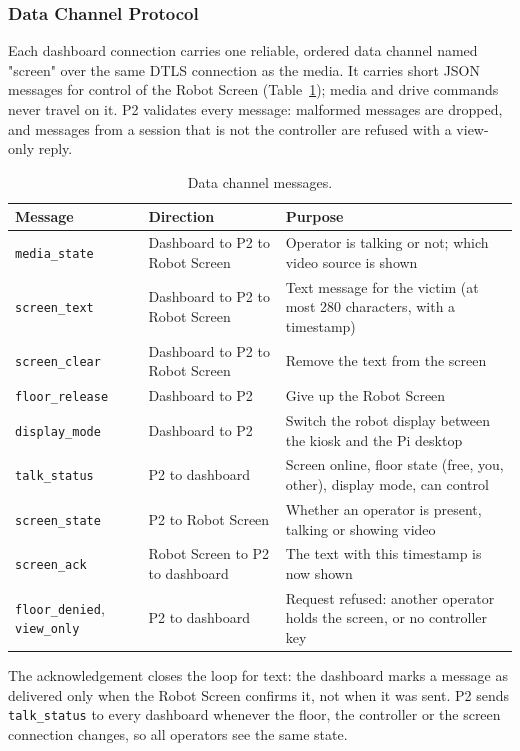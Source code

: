\subsubsection{Data Channel Protocol}
\label{sec:data_channel}

Each dashboard connection carries one reliable, ordered data channel named "screen" over the same DTLS connection as the media. It carries short JSON messages for control of the Robot Screen (Table~\ref{tab:13}); media and drive commands never travel on it. P2 validates every message: malformed messages are dropped, and messages from a session that is not the controller are refused with a view-only reply.

\begin{table}[!t]
\centering
\caption{Data channel messages.}
\label{tab:13}
\begin{tabularx}{\linewidth}{l p{4.3cm} X}
\toprule
Message & Direction & Purpose \\
\midrule
\texttt{media\_state} & Dashboard to P2 to Robot Screen & Operator is talking or not; which video source is shown \\
\texttt{screen\_text} & Dashboard to P2 to Robot Screen & Text message for the victim (at most 280 characters, with a timestamp) \\
\texttt{screen\_clear} & Dashboard to P2 to Robot Screen & Remove the text from the screen \\
\texttt{floor\_release} & Dashboard to P2 & Give up the Robot Screen \\
\texttt{display\_mode} & Dashboard to P2 & Switch the robot display between the kiosk and the Pi desktop \\
\texttt{talk\_status} & P2 to dashboard & Screen online, floor state (free, you, other), display mode, can control \\
\texttt{screen\_state} & P2 to Robot Screen & Whether an operator is present, talking or showing video \\
\texttt{screen\_ack} & Robot Screen to P2 to dashboard & The text with this timestamp is now shown \\
\texttt{floor\_denied}, \texttt{view\_only} & P2 to dashboard & Request refused: another operator holds the screen, or no controller key \\
\bottomrule
\end{tabularx}
\end{table}

The acknowledgement closes the loop for text: the dashboard marks a message as delivered only when the Robot Screen confirms it, not when it was sent. P2 sends \texttt{talk\_status} to every dashboard whenever the floor, the controller or the screen connection changes, so all operators see the same state.

